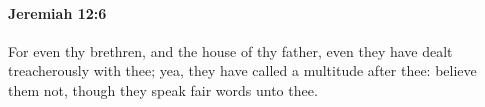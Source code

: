 
		\paragraph{Jeremiah 12:6} %
			\label{JEREMIAH-12-6}

			For even thy brethren, and the house of thy father, even they have dealt treacherously with thee; yea, they have called a multitude after thee: believe them not, though they speak fair words unto thee.


